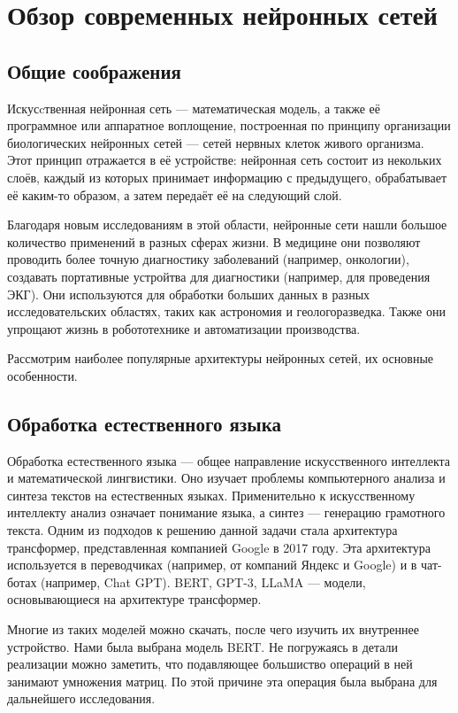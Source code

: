 \section{Обзор современных нейронных сетей}
\label{sec:Chapter2} 

\subsection{Общие соображения}

Искусcтвенная нейронная сеть --- математическая модель, а также её программное или
аппаратное воплощение, построенная по принципу организации биологических нейронных
сетей --- сетей нервных клеток живого организма. Этот принцип отражается в её
устройстве: нейронная сеть состоит из некольких слоёв, каждый из которых принимает
информацию с предыдущего, обрабатывает её каким-то образом, а  затем передаёт её
на следующий слой.

Благодаря новым исследованиям в этой области, нейронные сети нашли большое
количество применений в разных сферах жизни. В медицине они позволяют проводить
более точную диагностику заболеваний (например, онкологии), создавать портативные
устройтва для диагностики (например, для проведения ЭКГ). Они используются
для обработки больших данных в разных исследовательских областях, таких как
астрономия и геологоразведка. Также они упрощают жизнь в робототехнике и
автоматизации производства.

Рассмотрим наиболее популярные архитектуры нейронных сетей, их основные особенности.

\subsection{Обработка естественного языка}

Обработка естественного языка --- общее направление искусственного интеллекта и
математической лингвистики. Оно изучает проблемы компьютерного анализа и синтеза
текстов на естественных языках. Применительно к искусственному интеллекту анализ
означает понимание языка, а синтез --- генерацию грамотного текста. Одним из
подходов к решению данной задачи стала архитектура трансформер, представленная
компанией Google в 2017 году. Эта архитектура используется в переводчиках
(например, от компаний Яндекс и Google) и в чат-ботах (например, Chat GPT).
BERT, GPT-3, LLaMA --- модели, основывающиеся на архитектуре трансформер.

Многие из таких моделей можно скачать, после чего изучить их внутреннее
устройство. Нами была выбрана модель BERT. Не погружаясь в детали реализации
можно заметить, что подавляющее большиство операций в ней занимают
умножения матриц. По этой причине эта операция была выбрана для
дальнейшего исследования.


